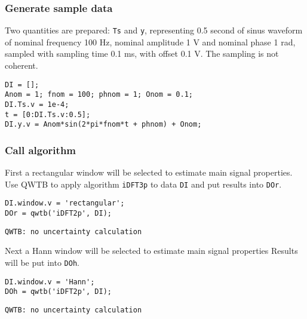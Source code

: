 \startcontents[localtoc]



{}
\subsubsection*{Generate sample data}



Two quantities are prepared: \texttt{Ts} and \texttt{y}, representing 0.5 second of sinus waveform of nominal
frequency 100 Hz, nominal amplitude 1 V and nominal phase 1 rad, sampled with sampling time 0.1
ms, with offset 0.1 V. The sampling is not coherent.

\begin{lstlisting}
DI = [];
Anom = 1; fnom = 100; phnom = 1; Onom = 0.1;
DI.Ts.v = 1e-4;
t = [0:DI.Ts.v:0.5];
DI.y.v = Anom*sin(2*pi*fnom*t + phnom) + Onom;
\end{lstlisting}


{}
\subsubsection*{Call algorithm}



First a rectangular window will be selected to estimate main signal properties. Use QWTB to apply
algorithm \texttt{iDFT3p} to data \texttt{DI} and put results into \texttt{DOr}.

\begin{lstlisting}
DI.window.v = 'rectangular';
DOr = qwtb('iDFT2p', DI);
\end{lstlisting}
\begin{lstlisting}[language={},xleftmargin=5pt,frame=none]
QWTB: no uncertainty calculation

\end{lstlisting}


Next a Hann window will be selected to estimate main signal properties Results will be put into \texttt{DOh}.

\begin{lstlisting}
DI.window.v = 'Hann';
DOh = qwtb('iDFT2p', DI);
\end{lstlisting}
\begin{lstlisting}[language={},xleftmargin=5pt,frame=none]
QWTB: no uncertainty calculation

\end{lstlisting}


